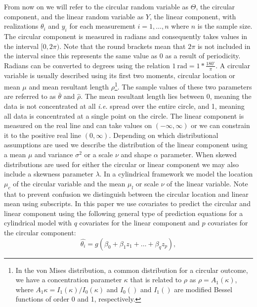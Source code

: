 \documentclass[man,mask]{apa6}
\let\rmarkdownfootnote\footnote%
\def\footnote{\protect\rmarkdownfootnote}
\begin{document}
\indent From now on we will refer to the circular random variable as \(\Theta\),
the circular component, and the linear random variable as \(Y\), the linear
component, with realizations \(\theta_i\) and \(y_i\) for each measurement \(i=1, \dots, n\) where \(n\) is the sample size. The circular component is measured in
radians and consequently takes values in the interval \([0, 2\pi)\). Note that the
round brackets mean that \(2\pi\) is not included in the interval since this
represents the same value as 0 as a result of periodicity. Radians can be
converted to degrees using the relation \(1 \:\text{rad} = 1*\frac{180^\circ}{\pi}\). A circular variable is usually described using its
first two moments, circular location or mean \(\mu\) and mean resultant length
\(\rho\)\footnote{In the von Mises distribution, a common distribution for a
circular outcome, we have a concentration parameter $\kappa$ that is related to
$\rho$ as $\rho = A_1(\kappa)$, where $A_1{\kappa} = I_1(\kappa)/I_0(\kappa)$
and $I_0()$ and $I_1()$ are modified Bessel functions of order 0 and 1,
respectively.}. The sample values of these two parameters are referred to as
\(\bar{\theta}\) and \(\hat{\rho}\). The mean resultant length lies between 0,
meaning the data is not concentrated at all \emph{i.e.} spread over the entire
circle, and 1, meaning all data is concentrated at a single point on the circle.
The linear component is measured on the real line and can take values on
\((-\infty, \infty)\) or we can constrain it to the positive real line \((0, \infty)\). Depending on which distributional assumptions are used we describe the
distribution of the linear component using a mean \(\mu\) and variance \(\sigma^2\)
or a scale \(\nu\) and shape \(\alpha\) parameter. When skewed distributions are
used for either the circular or linear component we may also include a skewness
parameter \(\lambda\).\newline
\indent In a cylindrical framework we model the location \(\mu_c\) of the circular
variable and the mean \(\mu_l\) or scale \(\nu\) of the linear variable. Note that
to prevent confusion we distinguish between the circular location and linear
mean using subscripts. In this paper we use covariates to predict the circular
and linear component using the following general type of prediction equations
for a cylindrical model with \(q\) covariates for the linear component and \(p\)
covariates for the circular component:
\begin{equation}\label{circpredgen}
\hat{\theta_i} = g(\beta_0 + \beta_1z_1 + \dots + \beta_qz_p),
\end{equation}
\end{document}
